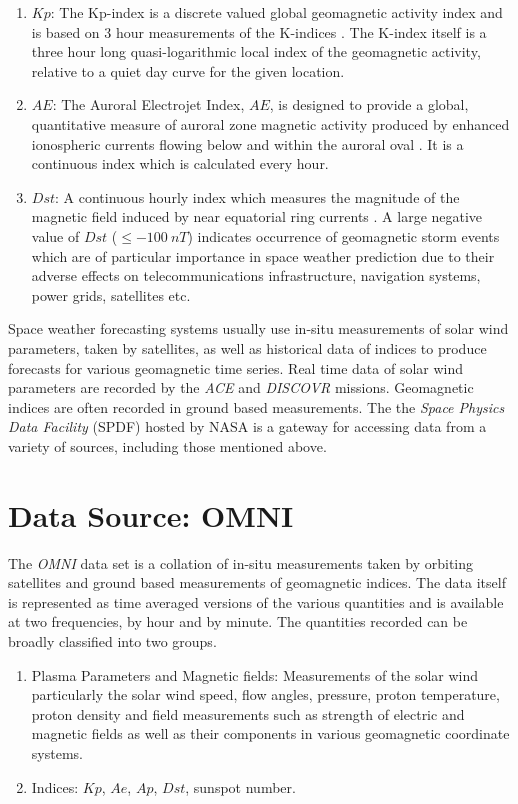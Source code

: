 \documentclass{article}
\begin{document}
\begin{enumerate}
\item $Kp$: The Kp-index is a discrete valued global geomagnetic
  activity index and is based on 3 hour measurements of the
  K-indices \citep{Bartels}. The K-index itself is a three hour
  long quasi-logarithmic local index of the geomagnetic activity,
  relative to a quiet day curve for the given location.
  
\item $AE$: The Auroral Electrojet Index, $AE$, is designed to
  provide a global, quantitative measure of auroral zone magnetic
  activity produced by enhanced ionospheric currents flowing below
  and within the auroral oval \citep{AEIndex}. It is a continuous index which is calculated every hour.
  
\item $Dst$: A continuous hourly index which measures the
  magnitude of the magnetic field induced by near equatorial ring
  currents \citep{DesslerAndParker}. A large negative value of
  $Dst$ ($ \leq -100 \ nT$) indicates occurrence of geomagnetic
  storm events which are of particular importance in space weather
  prediction due to their adverse effects on telecommunications
  infrastructure, navigation systems, power grids, satellites etc. 
\end{enumerate}

Space weather forecasting systems usually use in-situ measurements of
solar wind parameters, taken by satellites, as well as historical data
of indices to produce forecasts for various geomagnetic time
series. Real time data of solar wind parameters are recorded by the \emph{ACE}
and \emph{DISCOVR} missions. Geomagnetic indices are often recorded in
ground based measurements. The the \emph{Space Physics Data Facility}
(SPDF) hosted by NASA is a gateway for accessing data from a variety
of sources, including those mentioned above.

\section{Data Source: OMNI}
The \emph{OMNI} data set is a collation of in-situ measurements taken by orbiting satellites and ground based measurements of geomagnetic indices. The data itself is represented as time averaged versions of the various quantities and is available at two frequencies, by hour and by minute. The quantities recorded can be broadly classified into two groups.

\begin{enumerate}

\item Plasma Parameters and Magnetic fields: Measurements of the solar wind particularly the solar wind speed, flow angles, pressure, proton temperature, proton density and field measurements such as strength of electric and magnetic fields as well as their components in various geomagnetic coordinate systems.
  
\item Indices: $Kp$, $Ae$, $Ap$, $Dst$, sunspot number.
  
\end{enumerate}
\end{document}
